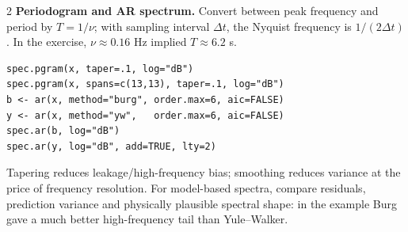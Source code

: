 \documentclass[9pt,a4paper]{extarticle}
\newcommand{\key}[1]{\textbf{#1}}
\begin{document}
\begin{multicols}{2}
\key{Periodogram and AR spectrum.} Convert between peak frequency and period by \(T=1/\nu\); with sampling interval \(\Delta t\), the Nyquist frequency is \(1/(2\Delta t)\). In the exercise, \(\nu\approx0.16\) Hz implied \(T\approx6.2\) s.
{\scriptsize
\begin{verbatim}
spec.pgram(x, taper=.1, log="dB")
spec.pgram(x, spans=c(13,13), taper=.1, log="dB")
b <- ar(x, method="burg", order.max=6, aic=FALSE)
y <- ar(x, method="yw",   order.max=6, aic=FALSE)
spec.ar(b, log="dB")
spec.ar(y, log="dB", add=TRUE, lty=2)
\end{verbatim}}
Tapering reduces leakage/high-frequency bias; smoothing reduces variance at the price of frequency resolution. For model-based spectra, compare residuals, prediction variance and physically plausible spectral shape: in the example Burg gave a much better high-frequency tail than Yule--Walker.

\end{multicols}
\end{document}
